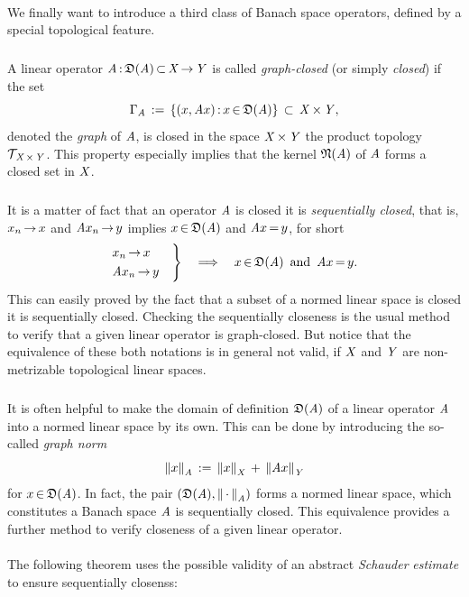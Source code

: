 \documentclass[11pt,twoside]{article}
\begin{document}
\paragraph{}
We finally want to introduce a third class of Banach space operators,
defined by a special topological feature.

\subparagraph{}
A linear operator $\mathit{A} {\,:\,} \mathfrak{D}(\mathit{A}) {\,\subset\,} \mathit{X} {\,\to\,} \mathit{Y}$
is called \textit{graph-closed} (or simply \textit{closed}) if the set
\[
\Gamma_{\mathit{A}} \,:=\,
\{(x,\mathit{A} x) {\,:\,} x {\,\in\,} \mathfrak{D}(\mathit{A})\} \, \subset \, \mathit{X} {\,\times\,} \mathit{Y},
\]
denoted the \textit{graph} of $\mathit{A}$,
is closed in the space $\mathit{X} {\,\times\,} \mathit{Y}$
{\wrt} the product topology $\mathcal{T}_{\,\mathit{X} {\,\times\,} \mathit{Y}}$.
This property especially implies that
the kernel $\mathfrak{N}(\mathit{A})$ of $\mathit{A}$ forms a closed set in $\mathit{X}$.

\subparagraph{} %
It is a matter of fact
that an operator $\mathit{A}$ is closed \iff it is \textit{sequentially closed},
that is,
$x_n {\,\to\,} x$ and $\mathit{A} x_n {\,\to\,} y$ implies
$x {\,\in\,} \mathfrak{D}(\mathit{A})$ and $\mathit{A} x {\,=\,} y$,
for short
\[
\begin{rcases}
 x_n       {\,\to\,} x \quad \\
 \mathit{A} x_n {\,\to\,} y \quad \\
\end{rcases}
\quad \Longrightarrow \quad
x {\,\in\,} \mathfrak{D}(\mathit{A}) \, \mbox{ and } \, \mathit{A} x {\,=\,} y.
\]
This can easily proved by the fact
that a subset of a normed linear space is closed
\iff it is sequentially closed.
Checking the sequentially closeness is the usual method
to verify that a given linear operator is graph-closed.
But notice that the equivalence of these both notations is in general not valid,
if $\mathit{X}$ and $\mathit{Y}$ are non-metrizable topological linear spaces.

\subparagraph{} %
It is often helpful to make the domain of definition $\mathfrak{D}(\mathit{A})$
of a linear operator $\mathit{A}$ into a normed linear space by its own.
This can be done by introducing the so-called \textit{graph norm}
\[
\left\lVert x \right\rVert_{\mathit{A}} \,:=\, \left\lVert x \right\rVert_{\mathit{X}} \,+\, \left\lVert \mathit{A} x \right\rVert_{\mathit{Y}}
\]
for $x {\,\in\,} \mathfrak{D}(\mathit{A})$.
In fact,
the pair $(\mathfrak{D}(\mathit{A}),\left\lVert \,\cdot\, \right\rVert_{\mathit{A}})$
forms a normed linear space,
which constitutes a Banach space \iff 
$\mathit{A}$ is sequentially closed.
This equivalence provides a further method
to verify closeness of a given linear operator.

\paragraph{} %
The following theorem
uses the possible validity of an abstract \textit{Schauder} \textit{estimate}
to ensure sequentially closenss:
\end{document}

